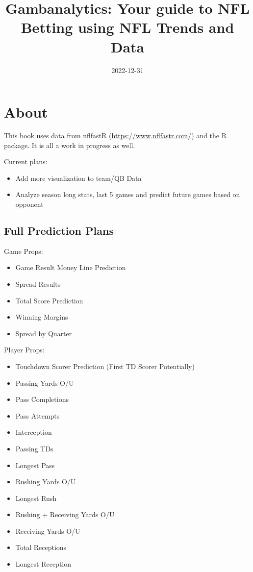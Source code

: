 \documentclass[
]{article}
\title{Gambanalytics: Your guide to NFL Betting using NFL Trends and Data}
\author{}
\date{\vspace{-2.5em}2022-12-31}
\begin{document}
\maketitle

{
\setcounter{tocdepth}{2}
\tableofcontents
}
\hypertarget{about}{%
\section{About}\label{about}}

This book uses data from nflfastR (\url{https://www.nflfastr.com/}) and the R package. It is all a work in progress as well.

Current plans:

\begin{itemize}
\item
  Add more visualization to team/QB Data
\item
  Analyze season long stats, last 5 games and predict future games based on opponent
\end{itemize}

\hypertarget{full-prediction-plans}{%
\subsection{Full Prediction Plans}\label{full-prediction-plans}}

Game Props:

\begin{itemize}
\item
  Game Result Money Line Prediction
\item
  Spread Results
\item
  Total Score Prediction
\item
  Winning Margins
\item
  Spread by Quarter
\end{itemize}

Player Props:

\begin{itemize}
\item
  Touchdown Scorer Prediction (First TD Scorer Potentially)
\item
  Passing Yards O/U
\item
  Pass Completions
\item
  Pass Attempts
\item
  Interception
\item
  Passing TDs
\item
  Longest Pass
\item
  Rushing Yards O/U
\item
  Longest Rush
\item
  Rushing + Receiving Yards O/U
\item
  Receiving Yards O/U
\item
  Total Receptions
\item
  Longest Reception
\end{itemize}
\end{document}
